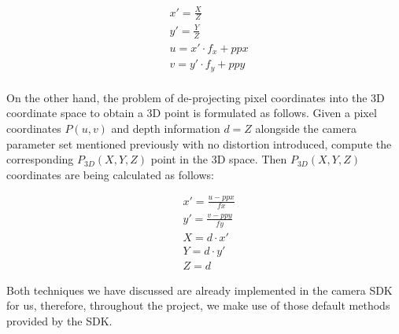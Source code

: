 \begin{equation}
    \begin{split}
    &x' = \frac{X}{Z}\\
    &y' = \frac{Y}{Z}\\
    &u = x' \cdot f_x + ppx\\
    &v = y' \cdot f_y + ppy\\
    \end{split}
\end{equation}

On the other hand, the problem of de-projecting pixel coordinates into the 3D coordinate space to obtain a 3D point is formulated as follows. Given a pixel coordinates $P(u, v)$ and depth information $d = Z$ alongside the camera parameter set mentioned previously with no distortion introduced, compute the corresponding $P_{3D}(X, Y, Z)$ point in the 3D space. Then $P_{3D}(X, Y, Z)$ coordinates are being calculated as follows:

\begin{equation}
    \begin{split}
    &x' = \frac{u - ppx}{fx}\\
    &y' = \frac{v - ppy}{fy}\\
    &X = d \cdot x'\\
    &Y = d \cdot y'\\
    &Z = d
    \end{split}
\end{equation}

Both techniques we have discussed are already implemented in the camera SDK for us, therefore, throughout the project, we make use of those default methods provided by the SDK.



